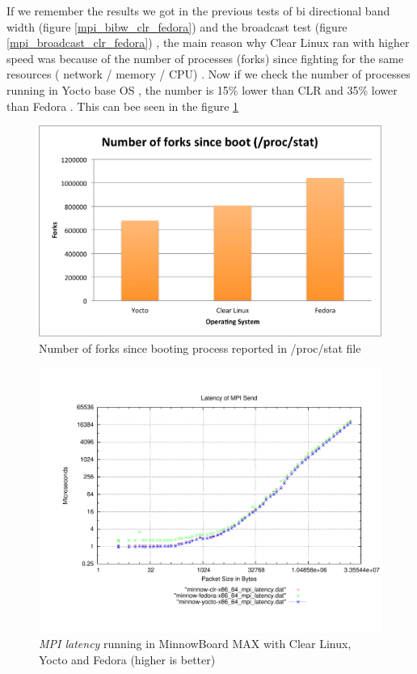 If we remember the results we got in the previous tests of bi directional band
width (figure \ref{mpi_bibw_clr_fedora}) and the broadcast test (figure
\ref{mpi_broadcast_clr_fedora}) , the main reason why Clear Linux ran with
higher speed was because of the number of processes (forks) since fighting for
the same resources ( network / memory / CPU) . Now if we check the number of
processes running in Yocto base OS , the number is 15\% lower than CLR and 35\%
lower than Fedora . This can bee seen in the figure \ref{number_forks_yocto}

\begin{figure}[H]
\centering
\includegraphics[width=1 \textwidth]{images/number_forks_yocto.png}
\caption{Number of forks since booting process reported in /proc/stat file }
\label{number_forks_yocto}
\end{figure}

\begin{figure}[H]
\centering
\includegraphics[width=1 \textwidth]{images/mpbench_yocto_experiments/mpi_latency.pdf}
\caption{\textit{MPI latency} running in  MinnowBoard MAX  with Clear Linux,
Yocto and Fedora (higher is better)}
\label{mpi_latency_yocto}
\end{figure}


